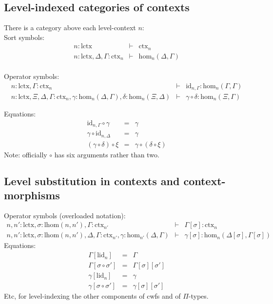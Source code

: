 \documentclass[11pt,a4paper]{article}
\theoremstyle{definition}
\newcommand{\id}{\mathsf{id}}
\def\lhom{\mathrm{lhom}}
\def\Hom{\mathrm{hom}}
\def\id{\mathrm{id}}
\def\lctx{\mathrm{lctx}}
\def\lid{\mathrm{lid}}
\newcommand{\ctx}{\mathrm{ctx}}
\begin{document}
\subsection{Level-indexed categories of contexts}

\begin{tiny}
There is a category above each level-context $n$:
\\
Sort symbols:
\begin{eqnarray*}
n : \lctx &\vdash& \ctx_n\\
n : \lctx, \Delta, \Gamma : \ctx_n &\vdash& \Hom_n(\Delta,\Gamma)\\
\end{eqnarray*}

Operator symbols:
\begin{eqnarray*}
n : \lctx, \Gamma : \ctx_n &\vdash& \id_{n,\Gamma} : \Hom_n(\Gamma,\Gamma)\\
n : \lctx, \Xi,\Delta,\Gamma : \ctx_n, \gamma : \Hom_n(\Delta,\Gamma), \delta : \Hom_n(\Xi,\Delta) &\vdash&
\gamma \circ \delta : \Hom_n(\Xi,\Gamma)
\end{eqnarray*}

Equations:
\begin{eqnarray*}
\id_{n,\Gamma} \circ \gamma &=& \gamma \\
 \gamma \circ \id_{n,\Delta} &=& \gamma \\
(\gamma \circ \delta) \circ \xi &=& \gamma \circ (\delta \circ \xi)
\end{eqnarray*}
Note: officially $\circ$ has six arguments rather than two.
\end{tiny}

\subsection{Level substitution in contexts and context-morphisms}

\begin{tiny}
Operator symbols (overloaded notation):
\begin{eqnarray*}
n, n' : \lctx , \sigma : \lhom(n,n'), \Gamma : \ctx_{n'} &\vdash& 
\Gamma[\sigma] : \ctx_n\\
n, n' : \lctx , \sigma : \lhom(n,n'), \Delta,\Gamma : \ctx_{n'}, \gamma : \Hom_{n'}(\Delta,\Gamma) 
&\vdash& 
\gamma[\sigma] : \Hom_{n}(\Delta[\sigma],\Gamma[\sigma]) 
\end{eqnarray*}
Equations:
\begin{eqnarray*}
\Gamma[\lid_n] &=& \Gamma\\
\Gamma[\sigma \circ \sigma'] &=& \Gamma[\sigma][\sigma']\\
\gamma[\lid_n] &=& \gamma\\
\gamma[\sigma \circ \sigma'] &=& \gamma[\sigma][\sigma']
\end{eqnarray*}
Etc, for level-indexing the other components of cwfs and of $\Pi$-types.
\end{tiny}
\end{document}
